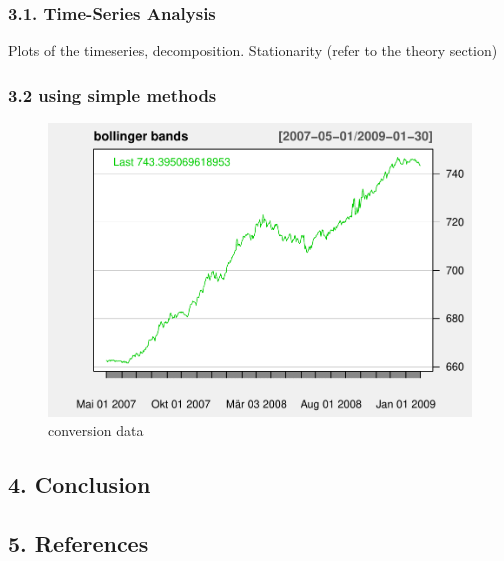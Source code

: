 \documentclass[
]{article}
\begin{document}
\hypertarget{ts-analysis}{%
\subsubsection{3.1. Time-Series Analysis}\label{ts-analysis}}

Plots of the timeseries, decomposition. Stationarity (refer to the
theory section)

\hypertarget{using-simple-methods}{%
\subsubsection{3.2 using simple methods}\label{using-simple-methods}}

\begin{figure}

{\centering \includegraphics[width=0.7\linewidth]{00_main_files/figure-latex/chap3.2-1} 

}

\caption{conversion data}\label{fig:chap3.2}
\end{figure}

\newpage

\hypertarget{conclusion}{%
\subsection{4. Conclusion}\label{conclusion}}

\newpage

\hypertarget{references}{%
\subsection{5. References}\label{references}}
\end{document}
